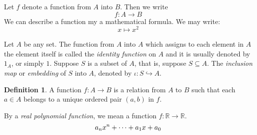 \documentclass[letterpaper, 10pt]{article}
\theoremstyle{definition}
\newtheorem*{define*}{Definition}
\def\myfunc#1#2#3{#1 \colon #2 \to #3}
\def\mymap#1#2{#1 \mapsto #2}
\def\polyterm#1#2#3{%
	\if#3n
		#2_{#3}#1^{#3}
		\else\ifnum#3=1
	#2_#3#1
	\else\ifnum#3=0
		#2_#3
	\else
	\fi
	\fi
	\fi
}
\def\polynomial#1#2#3{%
	\polyterm #1#2#3 +
	\cdots +
	\polyterm #1#2{1} +
	\polyterm #1#2{0}
}
\begin{document}
Let $f$ denote a function from $A$ into $B$. Then we write
\[
	\myfunc fAB
\]
We can describe a function my a mathematical formula. We may write:
\[
	\mymap x{x^2}
\]

Let $A$ be any set. The function from $A$ into $A$ which assigns to each element
in $A$ the element itself is called the \emph{identity function} on $A$ and it
is usually denoted by $1_A$, or simply $1$.
Suppose $S$ is a subset of $A$, that is, suppose $S \subseteq A$. The
\emph{inclusion map} or \emph{embedding} of $S$ into $A$, denoted by
$\iota\colon S \hookrightarrow A$.

\begin{define*}
	A function $\myfunc fAB$ is a relation from $A$ to $B$ such that each $a \in
	A$ belongs to a unique ordered pair $(a,b)$ in $f$.
\end{define*}

By a \emph{real polynomial function}, we mean a function $\myfunc
f{\mathbb{R}}\mathbb{R}$.
\[
	\polynomial xan
\]
\end{document}
